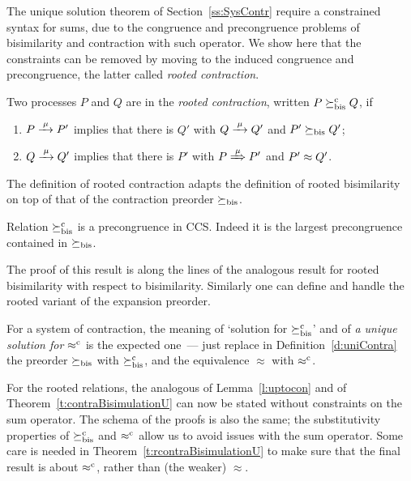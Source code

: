 The unique solution theorem of Section~\ref{ss:SysContr} require a
constrained syntax for sums, due to the congruence and precongruence
problems of bisimilarity and contraction with such operator. 
We show here that the constraints can be
removed by moving to the induced congruence and precongruence, the
latter 
called \emph{rooted contraction}.
\begin{definition}
\label{d:rcontra}
Two processes $P$ and $Q$ are in the \emph{rooted contraction}, written 
 $P\mathrel{\succeq^{\rm{c}}_{\rm{bis}}} Q$, if
\begin{enumerate}
\item $P \arr\mu P'$ implies that there is $Q'$ with $Q \arr \mu Q'$
 and $P'\mathrel{\succeq_{\rm{bis}}} Q'$;
\item $Q \arr\mu Q'$   implies that there is $P'$ with $P \Arr \mu
 P'$ and $P' \approx Q'$.
\end{enumerate}
\end{definition}

The definition of rooted contraction adapts the definition of rooted
bisimilarity on top of that of the  contraction preorder
$\mathrel{\succeq_{\rm{bis}}}$.




\begin{theorem}
\label{t:rcontrPrecongruence}
Relation $\mathrel{\succeq^{\rm{c}}_{\rm{bis}}}$ is a precongruence in CCS.  Indeed it is the
largest precongruence contained in $\mathrel{\succeq_{\rm{bis}}}$.
\end{theorem}  
The proof of this result is along the lines of the analogous result
for rooted bisimilarity with respect to bisimilarity. 
Similarly one can define and handle the rooted variant of the expansion preorder. 

For a system of contraction, the meaning of 
`solution  for $\mathrel{\succeq^{\rm{c}}_{\rm{bis}}}$' and of 
 \emph{a unique 
solution for $\mathrel{\approx^{\rm{c}}}$}
is the expected one~--- just replace in Definition~\ref{d:uniContra}  the preorder 
$\mathrel{\succeq_{\rm{bis}}}$ with $\mathrel{\succeq^{\rm{c}}_{\rm{bis}}}$, and the equivalence 
$\approx$ with $\mathrel{\approx^{\rm{c}}}$.

For the rooted relations, the analogous of Lemma~\ref{l:uptocon} and of
Theorem~\ref{t:contraBisimulationU} can now be stated without constraints on the sum
operator.  
The schema of the proofs is also the same; the substitutivity
properties of 
$\mathrel{\succeq^{\rm{c}}_{\rm{bis}}}$ and $\mathrel{\approx^{\rm{c}}}$ allow us to avoid issues with the sum
operator. Some care is needed in Theorem~\ref{t:rcontraBisimulationU}
to make sure that the final result is about  
$\mathrel{\approx^{\rm{c}}}$, rather than (the weaker) $\approx$.


